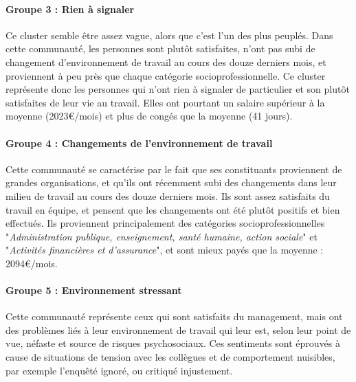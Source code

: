 \documentclass[11pt,fleqn,a4paper,openany,frenchb]{book} %
\begin{document}
\paragraph{Groupe 3 : Rien à signaler\\}
Ce cluster semble être assez vague, alors que c'est l'un des plus peuplés. Dans cette communauté, les personnes sont plutôt satisfaites, n'ont pas subi de changement d'environnement de travail au cours des douze derniers mois, et proviennent à peu près que chaque catégorie socioprofessionnelle. Ce cluster représente donc les personnes qui n'ont rien à signaler de particulier et son plutôt satisfaites de leur vie au travail. Elles ont pourtant un salaire supérieur à la moyenne (2023\euro{}/mois) et plus de congés que la moyenne (41 jours).

\paragraph{Groupe 4 : Changements   de   l'environnement   de
travail\\}
Cette communauté se caractérise par le fait que ses constituants proviennent de grandes organisations, et qu'ils ont récemment subi des changements dans leur milieu de travail au cours des douze derniers mois. Ils sont assez satisfaits du travail en équipe, et pensent que les changements ont été plutôt positifs et bien effectués. Ils proviennent principalement des catégories socioprofessionnelles "\textit{Administration publique, enseignement, santé humaine, action sociale}" et "\textit{Activités financières et d'assurance}", et sont mieux payés que la moyenne : 2094\euro{}/mois.

\paragraph{Groupe 5 : Environnement stressant\\}
Cette communauté représente ceux qui sont satisfaits du management, mais ont des problèmes liés à leur environnement de travail qui leur est, selon leur point de vue, néfaste et source de risques psychosociaux. Ces sentiments sont éprouvés à cause de situations de tension avec les collègues et de comportement nuisibles, par exemple l'enquêté ignoré, ou critiqué injustement.
\end{document}
